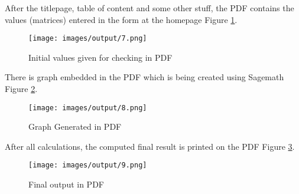 After the titlepage, table of content and some other stuff, the PDF contains 
the values (matrices) entered in the form at the homepage Figure \ref{fig:6}.
\begin{figure}[H] 
\centering \texttt{[image: images/output/7.png]}
\caption{Initial values given for checking in PDF}
\label{fig:6}
\end{figure}

There is graph embedded in the PDF which is being created using Sagemath Figure \ref{fig:7}.
\begin{figure}[H] 
\centering \texttt{[image: images/output/8.png]}
\caption{Graph Generated in PDF}
\label{fig:7}
\end{figure}

After all calculations, the computed final result is printed on the PDF Figure \ref{fig:8}.
\begin{figure}[H] 
\centering \texttt{[image: images/output/9.png]}
\caption{Final output in PDF}
\label{fig:8}
\end{figure}
